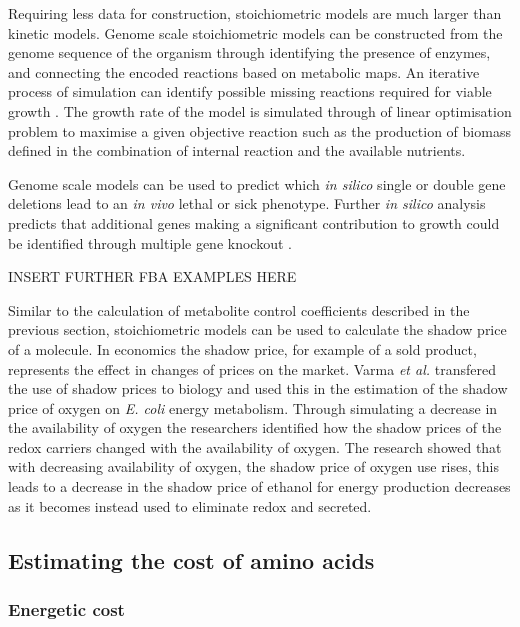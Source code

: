 Requiring less data for construction, stoichiometric models are much larger than kinetic models. Genome scale stoichiometric models can be constructed from the genome sequence of the organism through identifying the presence of enzymes, and connecting the encoded reactions based on metabolic maps. An iterative process of simulation can identify possible missing reactions required for viable growth \cite{genome_model_construction}. The growth rate of the model is simulated through of linear optimisation problem to maximise a given objective reaction such as the production of biomass defined in the combination of internal reaction and the available nutrients.

Genome scale models can be used to predict which \emph{in silico} single \cite{single_knockout} or double \cite{double_knockout} gene deletions lead to an \emph{in vivo} lethal or sick phenotype. Further \emph{in silico} analysis predicts that additional genes making a significant contribution to growth could be identified through multiple gene knockout \cite{deutscher2008}.

INSERT FURTHER FBA EXAMPLES HERE

Similar to the calculation of metabolite control coefficients described in the previous section, stoichiometric models can be used to calculate the shadow price of a molecule. In economics the shadow price, for example of a sold product, represents the effect in changes of prices on the market. Varma \emph{et al.} \cite{varma1993} transfered the use of shadow prices to biology and used this in the estimation of the shadow price of oxygen on \emph{E. coli} energy metabolism. Through simulating a decrease in the availability of oxygen the researchers identified how the shadow prices of the redox carriers changed with the availability of oxygen. The research showed that with decreasing availability of oxygen, the shadow price of oxygen use rises, this leads to a decrease in the shadow price of ethanol for energy production decreases as it becomes instead used to eliminate redox and secreted.

\subsection{Estimating the cost of amino acids}

\subsubsection{Energetic cost}

